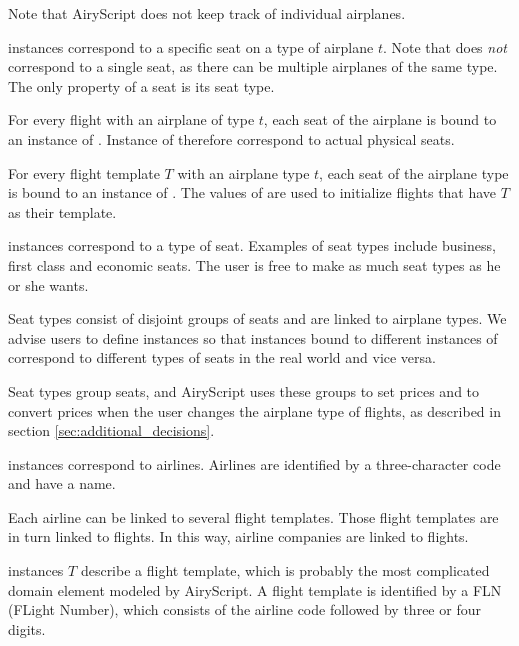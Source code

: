 \begin{description}
    Note that AiryScript does not keep track of individual airplanes.

  \item[\dbf{Seat}] instances correspond to a specific seat on a type of
    airplane $t$. Note that  does \emph{not} correspond to a single
    seat, as there can be multiple airplanes of the same type. The only property
    of a seat is its seat type.

    For every flight with an airplane of type $t$, each seat of the airplane is
    bound to an instance of .
    Instance of  therefore correspond to actual physical
    seats.

    For every flight template $T$ with an airplane type $t$, each seat of the
    airplane type is bound to an instance of . The
    values of  are used to initialize flights that
    have $T$ as their template.

  \item[\dbf{SeatType}] instances correspond to a type of seat. Examples of seat
    types include business, first class and economic seats. The user is free to
    make as much seat types as he or she wants.

    Seat types consist of disjoint groups of seats and are linked to airplane
    types. We advise users to define  instances so that 
    instances bound to different instances of  correspond to
    different types of seats in the real world and vice versa.
    
    Seat types group seats, and AiryScript uses these groups to set prices and
    to convert prices when the user changes the airplane type of flights, as
    described in section \ref{sec:additional_decisions}.

  \item[\dbf{Airline}] instances correspond to airlines. Airlines are identified
    by a three-character code and have a name.

    Each airline can be linked to several flight templates. Those flight
    templates are in turn linked to flights. In this way, airline companies are
    linked to flights.

  \item[\dbf{Template}] instances $T$ describe a flight template, which is
    probably the most complicated domain element modeled by AiryScript. A flight
    template is identified by a FLN (FLight Number), which consists of the
    airline code followed by three or four digits.
    

\end{description}
